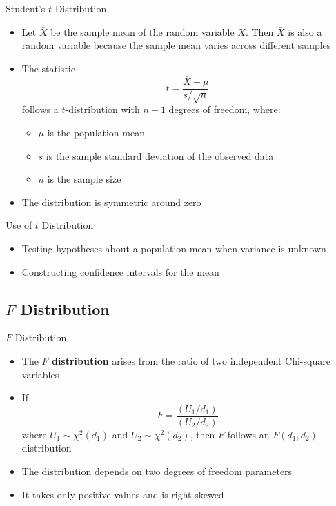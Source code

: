\documentclass[12pt, aspectratio=169]{beamer}
\begin{document}
    \begin{frame}{Student's \(t\) Distribution}
        \begin{itemize}
            \item Let \(\bar{X}\) be the sample mean of the random variable \(X\). Then \(\bar{X}\) is also a random variable because the sample mean varies across different samples
            \item The statistic
            \[
                t = \frac{\bar{X} - \mu}{s/\sqrt{n}}
            \]
            follows a \(t\)-distribution with \(n-1\) degrees of freedom, where:
            \begin{itemize}
                \item \(\mu\) is the population mean
                \item \(s\) is the sample standard deviation of the observed data
                \item \(n\) is the sample size
            \end{itemize}
            \item The distribution is symmetric around zero
        \end{itemize}
    \end{frame}


    \begin{frame}{Use of \(t\) Distribution}
        \begin{itemize}
            \item Testing hypotheses about a population mean when variance is unknown
            \item Constructing confidence intervals for the mean
        \end{itemize}
    \end{frame}


    \subsection{\(F\) Distribution}

    \begin{frame}{\(F\) Distribution}
        \begin{itemize}
            \item The \textbf{\(F\) distribution} arises from the ratio of two independent Chi-square variables
            \item If
            \[
                F = \frac{(U_1 / d_1)}{(U_2 / d_2)}
            \]
            where \(U_1 \sim \chi^2(d_1)\) and \(U_2 \sim \chi^2(d_2)\), then \(F\) follows an \(F(d_1,d_2)\) distribution
            \item The distribution depends on two degrees of freedom parameters
            \item It takes only positive values and is right-skewed
        \end{itemize}
    \end{frame}
\end{document}
